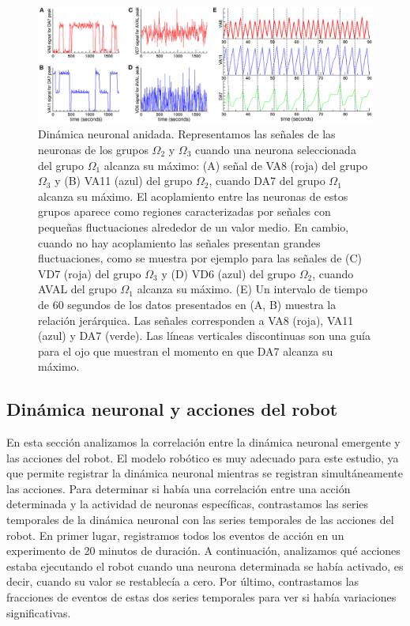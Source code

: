  \begin{figure}[h!]
	\centering\includegraphics[width=\imsize]{anidado.jpg}
	\caption[ Dinámica neuronal anidada.]{Dinámica neuronal anidada. Representamos las señales de las neuronas de los grupos $\Omega_2$ y $\Omega_3$ cuando una neurona seleccionada del grupo $\Omega_1$ alcanza su máximo: (A) señal de VA8 (roja) del grupo $\Omega_3$ y (B) VA11 (azul) del grupo $\Omega_2$, cuando DA7 del grupo $\Omega_1$ alcanza su máximo. El acoplamiento entre las neuronas de estos grupos aparece como regiones caracterizadas por señales con pequeñas fluctuaciones alrededor de un valor medio. En cambio, cuando no hay acoplamiento las señales presentan grandes fluctuaciones, como se muestra por ejemplo para las señales de (C) VD7 (roja) del grupo $\Omega_3$ y (D) VD6 (azul) del grupo $\Omega_2$, cuando AVAL del grupo $\Omega_1$ alcanza su máximo. (E) Un intervalo de tiempo de 60 segundos de los datos presentados en (A, B) muestra la relación jerárquica. Las señales corresponden a VA8 (roja), VA11 (azul) y DA7 (verde). Las líneas verticales discontinuas son una guía para el ojo que muestran el momento en que DA7 alcanza su máximo.}\label{fig:anidado}
\end{figure}

\subsection{Dinámica neuronal y acciones del robot}

En esta sección analizamos la correlación entre la dinámica neuronal emergente y las acciones del robot. El modelo robótico es muy adecuado para este estudio, ya que permite registrar la dinámica neuronal mientras se registran simultáneamente las acciones. Para determinar si había una correlación entre una acción determinada y la actividad de neuronas específicas, contrastamos las series temporales de la dinámica neuronal con las series temporales de las acciones del robot. En primer lugar, registramos todos los eventos de acción en un experimento de 20 minutos de duración. A continuación, analizamos qué acciones estaba ejecutando el robot cuando una neurona determinada se había activado, es decir, cuando su valor se restablecía a cero. Por último, contrastamos las fracciones de eventos de estas dos series temporales para ver si había variaciones significativas.

